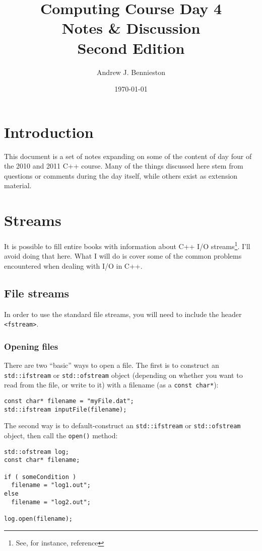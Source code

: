 \documentclass[a4paper]{scrartcl}
\title{Computing Course Day 4\\
Notes \& Discussion\\
Second Edition}
\author{Andrew J. Bennieston}
\date{\today}
\begin{document}
\maketitle

\tableofcontents

\pagebreak

\section{Introduction}\label{sec:introduction}
This document is a set of notes expanding on some of the content of day four of the 2010 and 2011 C++ course. Many of the things discussed here stem from questions or comments during the day itself, while others exist as extension material.

\section{Streams}\label{sec:streams}
It is possible to fill entire books with information about C++ I/O streams\footnote{See, for instance, reference\cite{IOStreams}}. I'll avoid doing that here. What I will do is cover some of the common problems encountered when dealing with I/O in C++.

\subsection{File streams}
In order to use the standard file streams, you will need to include the header \verb|<fstream>|.

\subsubsection{Opening files}
There are two ``basic'' ways to open a file. The first is to construct an \verb|std::ifstream| or \verb|std::ofstream| object (depending on whether you want to read from the file, or write to it) with a filename (as a \verb|const char*|):
\begin{verbatim}
const char* filename = "myFile.dat";
std::ifstream inputFile(filename);
\end{verbatim}

The second way is to default-construct an \verb|std::ifstream| or \verb|std::ofstream| object, then call the \verb|open()| method:
\begin{verbatim}
std::ofstream log;
const char* filename;

if ( someCondition )
  filename = "log1.out";
else
  filename = "log2.out";

log.open(filename);
\end{verbatim}
\end{document}
